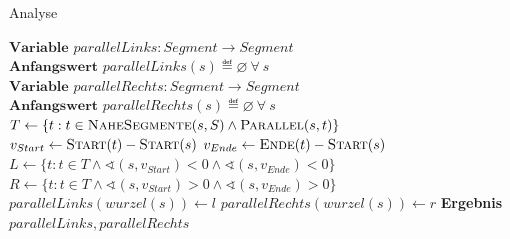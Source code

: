 \documentclass[../main/thesis.tex]{subfiles}
\begin{document}
\begin{algorithmhere}{Analyse}
\label{alg:Analyse}
\begin{algorithmic}
\State $\textbf{Variable } parallelLinks : Segment \rightarrow Segment$
\State $\textbf{Anfangswert } parallelLinks(s) \eqdef \varnothing\ \forall\ s$
\State $\textbf{Variable } parallelRechts : Segment \rightarrow Segment$
\State $\textbf{Anfangswert } parallelRechts(s) \eqdef \varnothing\ \forall\ s$
		\State $T \gets \{t : t \in \textproc{NaheSegmente}(s, S) \wedge \textproc{Parallel}(s, t)\}$  %
		\State $v_{Start} \gets \textproc{Start}(t) - \textproc{Start}(s)$
		\State $v_{Ende} \gets \textproc{Ende}(t) - \textproc{Start}(s)$
		\State $L \gets \{t : t \in T \wedge \sphericalangle (s, v_{Start}) < 0 \wedge \sphericalangle (s, v_{Ende}) < 0\}$
		\State $R \gets \{t : t \in T \wedge \sphericalangle (s, v_{Start}) > 0 \wedge \sphericalangle (s, v_{Ende}) > 0\}$
		\State{}
		\State{}
				\State $parallelLinks(wurzel(s)) \gets l$
			\EndIf
		\EndFor
				\State $parallelRechts(wurzel(s)) \gets r$
			\EndIf
		\EndFor
	\EndFor
	\State \textbf{Ergebnis} $parallelLinks, parallelRechts$
\EndFunction
\end{algorithmic}
\end{algorithmhere}

\end{document}
